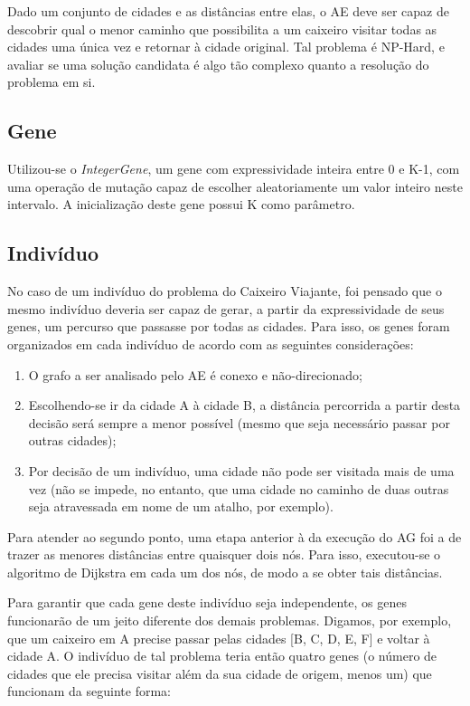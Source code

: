 Dado um conjunto de cidades e as distâncias entre elas, o AE deve ser capaz de descobrir qual o menor caminho que possibilita a um caixeiro visitar todas as cidades uma única vez e retornar à cidade original. Tal problema é NP-Hard, e avaliar se uma solução candidata é algo tão complexo quanto a resolução do problema em si.

\subsection*{Gene}

Utilizou-se o \emph{IntegerGene}, um gene com expressividade inteira entre 0 e K-1, com uma operação de mutação capaz de escolher aleatoriamente um valor inteiro neste intervalo. A inicialização deste gene possui K como parâmetro.

\subsection*{Indivíduo}

No caso de um indivíduo do problema do Caixeiro Viajante, foi pensado que o mesmo indivíduo deveria ser capaz de gerar, a partir da expressividade de seus genes, um percurso que passasse por todas as cidades. Para isso, os genes foram organizados em cada indivíduo de acordo com as seguintes considerações:

\begin{enumerate}[label={(\arabic*)}]
	\item O grafo a ser analisado pelo AE é conexo e não-direcionado;
	\item Escolhendo-se ir da cidade A à cidade B, a distância percorrida a partir desta decisão será sempre a menor possível (mesmo que seja necessário passar por outras cidades);
	\item Por decisão de um indivíduo, uma cidade não pode ser visitada mais de uma vez (não se impede, no entanto, que uma cidade no caminho de duas outras seja atravessada em nome de um atalho, por exemplo).
\end{enumerate}

Para atender ao segundo ponto, uma etapa anterior à da execução do AG foi a de trazer as menores distâncias entre quaisquer dois nós. Para isso, executou-se o algoritmo de Dijkstra \cite{dijkstra1959note} em cada um dos nós, de modo a se obter tais distâncias.

Para garantir que cada gene deste indivíduo seja independente, os genes funcionarão de um jeito diferente dos demais problemas. Digamos, por exemplo, que um caixeiro em A precise passar pelas cidades [B, C, D, E, F] e voltar à cidade A. O indivíduo de tal problema teria então quatro genes (o número de cidades que ele precisa visitar além da sua cidade de origem, menos um) que funcionam da seguinte forma:

